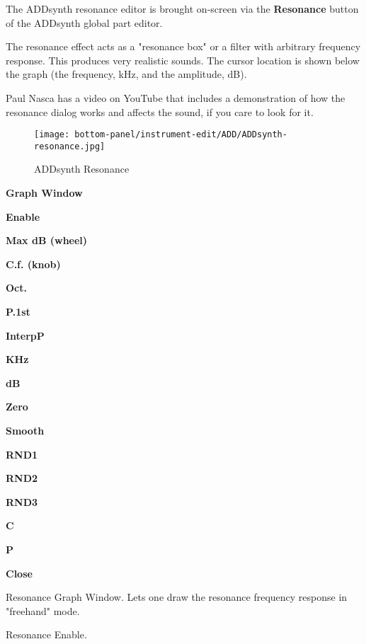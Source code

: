   The ADDsynth resonance editor is brought on-screen via the
   \textbf{Resonance} button of the ADDsynth global part editor.

   The resonance effect acts as a "resonance box" or a filter with arbitrary
   frequency response. This produces very realistic sounds. 
   The cursor location is shown below the graph (the frequency, kHz, and
   the amplitude, dB). 

   Paul Nasca has a video on YouTube that includes a demonstration of how
   the resonance dialog works and affects the sound, if you care to look for
   it.

\begin{figure}[H]
   \centering 
   \texttt{[image: bottom-panel/instrument-edit/ADD/ADDsynth-resonance.jpg]}
   \caption{ADDsynth Resonance}
   \label{fig:addsynth_resonance}
\end{figure}

   \begin{enumber}
      \item \textbf{Graph Window}
      \item \textbf{Enable}
      \item \textbf{Max dB (wheel)}
      \item \textbf{C.f. (knob)}
      \item \textbf{Oct.}
      \item \textbf{P.1st}
      \item \textbf{InterpP}
      \item \textbf{KHz}
      \item \textbf{dB}
      \item \textbf{Zero}
      \item \textbf{Smooth}
      \item \textbf{RND1}
      \item \textbf{RND2}
      \item \textbf{RND3}
      \item \textbf{C}
      \item \textbf{P}
      \item \textbf{Close}
   \end{enumber}

   \setcounter{ItemCounter}{0}      %

   Resonance Graph Window.
   Lets one draw the resonance frequency response in "freehand" mode.

   Resonance Enable.

